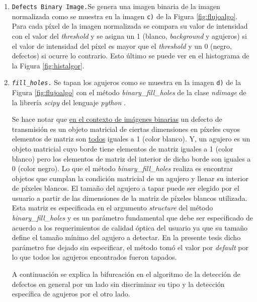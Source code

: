 \begin{enumerate}
\item \texttt{Defects Binary Image.}Se genera una imagen binaria de la imagen normalizada como se muestra en la imagen \texttt{c)} de la Figura \ref{fig:flujoalgo}. Para cada píxel de la imagen normalizada se compara su valor de intensidad con el valor del \textit{threshold} y se asigna un 1 (blanco, \textit{background} y agujeros) si el valor de intensidad del píxel es mayor que el \textit{threshold} y un 0 (negro, defectos) si ocurre lo contrario. Esto último se puede ver en el histograma de la Figura \ref{fig:histalgor}.
\item \texttt{\textit{fill\_holes}.} Se tapan los agujeros como se muestra en la imagen \texttt{d)} de la Figura \ref{fig:flujoalgo} con el método \textit{binary\_fill\_holes} de la clase \textit{ndimage} de la librería \textit{scipy} del lenguaje \textit{python} \cite{scipy}.

\hspace{0.5cm}Se hace notar que \underline{en el contexto de imágenes binarias} un defecto de transmisión es un objeto matricial de ciertas dimensiones en píxeles cuyos elementos de matriz son \underline{todos} iguales a 1 (color blanco). Y, un agujero es un objeto matricial cuyo borde tiene elementos de matriz iguales a 1 (color blanco) pero los elementos de matriz del interior de dicho borde son iguales a 0 (color negro). Lo que el método \textit{binary\_fill\_holes} realiza es encontrar objetos que cumplan la condición matricial de un agujero y llenar su interior de píxeles blancos. El tamaño del agujero a tapar puede ser elegido por el usuario a partir de las dimensiones de la matriz de píxeles blancos utilizada. Esta matriz es especificada en el argumento \textit{structure} del método \textit{binary\_fill\_holes} y es un parámetro fundamental que debe ser especificado de acuerdo a los requerimientos de calidad óptica del usuario ya que su tamaño define el tamaño mínimo del agujero a detectar. En la presente tesis dicho parámetro fue dejado sin especificar, el método tomó el valor por \textit{default} por lo que todos los agujeros encontrados fueron tapados.

\hspace{0.5cm}A continuación se explica la bifurcación en el algoritmo de la detección de defectos en general por un lado sin discriminar su tipo y la detección específica de agujeros por el otro lado.


\end{enumerate}
